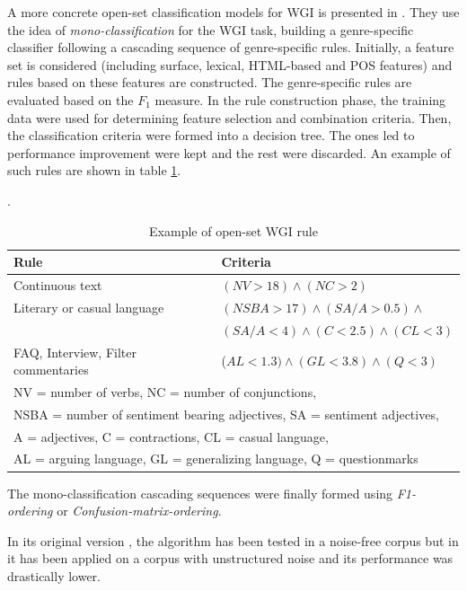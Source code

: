 A more concrete open-set classification models for WGI is presented in \parencite{stubbe2007genre}. They use the idea of \textit{mono-classification} for the WGI task, building a genre-specific classifier following a cascading sequence of genre-specific rules. Initially, a feature set is considered (including surface, lexical, HTML-based and POS features) and rules based on these features are constructed. The genre-specific rules are evaluated based on the $F_{1}$ measure. In the rule construction phase, the training data were used for determining feature selection and combination criteria. Then, the classification criteria were formed into a decision tree. The ones led to performance improvement were kept and the rest were discarded. An example of such rules are shown in table \ref{chap:relevant_work:tbl:stubbe_alg_rules}.

\begin{table}[t]
	\center
	\caption{Example of open-set WGI rule \parencite{stubbe2007genre}}\label{chap:relevant_work:tbl:stubbe_alg_rules}.
	\begin{tabular}{|l|l|}
		\hline
		Rule & Criteria \\
		\hline
		Continuous text & $(NV > 18) \wedge (NC > 2)$\\
		Literary or casual language & $(NSBA > 17) \wedge (SA/A > 0.5) \wedge$\\ 
		& $(SA/A < 4) \wedge (C < 2.5) \wedge (CL < 3)$\\
		FAQ, Interview, Filter commentaries &($AL < 1.3) \wedge (GL < 3.8) \wedge (Q < 3)$\\
		\hline
		\multicolumn{2}{|l|}{NV = number of verbs, NC = number of conjunctions,}\\
		\multicolumn{2}{|l|}{NSBA = number of sentiment bearing adjectives, SA = sentiment adjectives,}\\
		\multicolumn{2}{|l|}{A = adjectives, C = contractions, CL = casual language,}\\
		\multicolumn{2}{|l|}{AL = arguing language, GL = generalizing language, Q = questionmarks}\\
		\hline
	\end{tabular}
\end{table}

The mono-classification cascading sequences were finally formed using \textit{F1-ordering} or \textit{Confusion-matrix-ordering}.

In its original version \parencite{stubbe2007genre}, the algorithm has been tested in a noise-free corpus but in \parencite{Asheghi2015} it has been applied on a corpus with unstructured noise and its performance was drastically lower.

